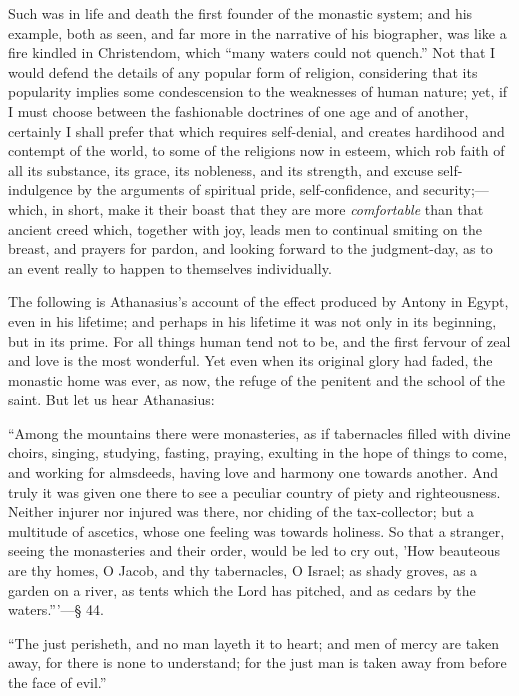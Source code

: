 Such was in life and death the first founder of the monastic
system; and his example, both as seen, and far more in the narrative
of his biographer, was like a fire kindled in Christendom, which
``many waters could not quench.'' Not that I would defend the
details of any popular form of religion, considering that its
popularity implies some condescension to the weaknesses of human
nature; yet, if I must choose between the fashionable doctrines of one
age and of another, certainly I shall prefer that which requires
self-denial, and creates hardihood and contempt of the world, to some
of the religions now in esteem, which rob faith of all its substance,
its grace, its nobleness, and its strength, and excuse self-indulgence
by the arguments of spiritual pride, self-confidence, and security;—which,
in short, make it their boast that they are more \emph{comfortable}
than that ancient creed which, together with joy, leads men to
continual smiting on the breast, and prayers for pardon, and looking
forward to the judgment-day, as to an event really to happen to
themselves individually.

The following is Athanasius's account of the effect produced by
Antony in Egypt, even in his lifetime; and perhaps in his lifetime it
was not only in its beginning, but in its prime. For all things human
tend not to be, and the first fervour of zeal and love is the most
wonderful. Yet even when its original glory had faded, the monastic
home was ever, as now, the refuge of the penitent and the school
of the saint. But let us hear Athanasius:

``Among the mountains there were monasteries, as if tabernacles
filled with divine choirs, singing, studying, fasting, praying,
exulting in the hope of things to come, and working for almsdeeds,
having love and harmony one towards another. And truly it was given
one there to see a peculiar country of piety and righteousness.
Neither injurer nor injured was there, nor chiding of the
tax-collector; but a multitude of ascetics, whose one feeling was
towards holiness. So that a stranger, seeing the monasteries and their
order, would be led to cry out, 'How beauteous are thy homes, O Jacob,
and thy tabernacles, O Israel; as shady groves, as a garden on a
river, as tents which the Lord has pitched, and as cedars by the
waters.'''—§ 44.


``The just perisheth, and no man layeth it to heart; and
men of mercy are taken away, for there is none to understand; for the
just man is taken away from before the face of evil.''

